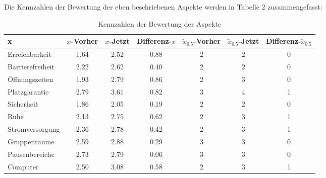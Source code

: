 \documentclass[11pt, a4paper]{article}
\begin{document}
Die Kennzahlen der Bewertung der eben beschriebenen Aspekte werden in Tabelle 2 zusammengefasst:
\begin{table}[h]
	\vspace*{0.2cm}
	\hspace*{0.48cm}
	\begin{tabular}{l|cccccc}
		x                & $\bar{x}$-Vorher & $\bar{x}$-Jetzt & Differenz-$\bar{x}$ & $\tilde{x}_{0.5}$-Vorher & $\tilde{x}_{0.5}$-Jetzt & Differenz-$\tilde{x}_{0.5}$\\ \hline
		Erreichbarkeit   & 1.64              & 2.52             & 0.88                 & 2             & 2            & 0                     \\
		Barrierefreiheit & 2.22              & 2.62             & 0.40                 & 2             & 2            & 0                     \\
		Öffnungszeiten   & 1.93              & 2.79             & 0.86                 & 2             & 3            & 0                     \\
		Platzgarantie    & 2.79              & 3.61             & 0.82                 & 3             & 4            & 1                     \\
		Sicherheit       & 1.86              & 2.05             & 0.19                 & 2             & 2            & 0                     \\
		Ruhe             & 2.13              & 2.75             & 0.62                 & 2             & 3            & 1                     \\
		Stromversorgung  & 2.36              & 2.78             & 0.42                 & 2             & 3            & 1                     \\
		Gruppenräume     & 2.59              & 2.88             & 0.29                 & 3             & 3            & \multicolumn{1}{c}{0} \\
		Pausenbereiche   & 2.73              & 2.79             & 0.06                 & 3             & 3            & 0                     \\
		Computer         & 2.50              & 3.08             & 0.58                 & 2             & 3            & 1                    
	\end{tabular}
	\vspace{0.2cm}
			\caption{Kennzahlen der Bewertung der Aspekte}
			\vspace{-0.1cm}
\end{table}
\end{document}

